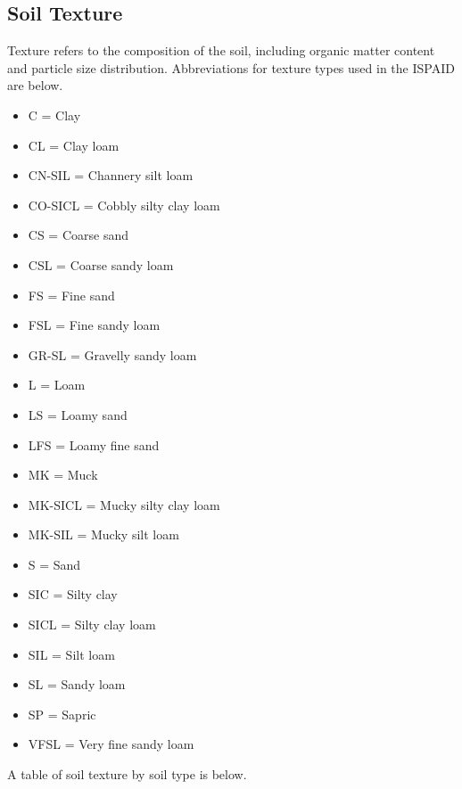 \documentclass[11pt]{article}
\begin{document}
\subsection{Soil Texture}
Texture refers to the composition of the soil, including organic matter content and particle size distribution. Abbreviations for texture types used in the ISPAID are below.
\begin{itemize}
\item C                =    Clay
\item CL              =    Clay loam
\item CN-SIL       =    Channery silt loam
\item CO-SICL     =    Cobbly silty clay loam
\item CS              =    Coarse sand
\item CSL            =    Coarse sandy loam
\item FS              =    Fine sand
\item FSL            =    Fine sandy loam
\item GR-SL        =    Gravelly sandy loam
\item L                =    Loam
\item LS              =    Loamy sand
\item LFS            =    Loamy fine sand
\item MK             =    Muck
\item MK-SICL    =    Mucky silty clay loam
\item MK-SIL       =    Mucky silt loam
\item S                =    Sand
\item SIC             =    Silty clay
\item SICL           =    Silty clay loam
\item SIL             =    Silt loam
\item SL              =    Sandy loam
\item SP              =    Sapric
\item VFSL          =    Very fine sandy loam
\end{itemize}
A table of soil texture by soil type is below.
\end{document}
